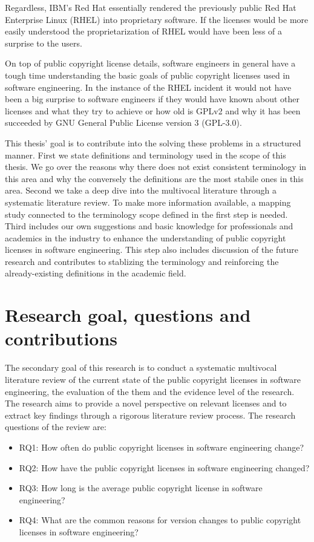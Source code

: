 Regardless, IBM's Red Hat essentially rendered the previously public Red Hat Enterprise Linux (RHEL) into proprietary software. If the licenses would be more easily understood the proprietarization of RHEL would have been less of a surprise to the users.

On top of public copyright license details, software engineers in general have a tough time understanding the basic goals of public copyright licenses used in software engineering. In the instance of the RHEL incident it would not have been a big surprise to software engineers if they would have known about other licenses and what they try to achieve or how old is GPLv2 and why it has been succeeded by GNU General Public License version 3 (GPL-3.0).

This thesis' goal is to contribute into the solving these problems in a structured manner. First we state definitions and terminology used in the scope of this thesis. We go over the reasons why there does not exist consistent terminology in this area and why the conversely the definitions are the most stabile ones in this area. Second we take a deep dive into the multivocal literature through a systematic literature review. To make more information available, a mapping study connected to the terminology scope defined in the first step is needed. Third includes our own suggestions and basic knowledge for professionals and academics in the industry to enhance the understanding of public copyright licenses in software engineering. This step also includes discussion of the future research and contributes to stablizing the terminology and reinforcing the already-existing definitions in the academic field.

\section{Research goal, questions and contributions}
The secondary goal of this research is to conduct a systematic multivocal literature review of the current state of the public copyright licenses in software engineering, the evaluation of the them and the evidence level of the research. The research aims to provide a novel perspective on relevant licenses and to extract key findings through a rigorous literature review process. The research questions of the review are:
\begin{itemize}
	\item RQ1: How often do public copyright licenses in software engineering change?
	\item RQ2: How have the public copyright licenses in software engineering changed?
	\item RQ3: How long is the average public copyright license in software engineering?
	\item RQ4: What are the common reasons for version changes to public copyright licenses in software engineering?
\end{itemize}

